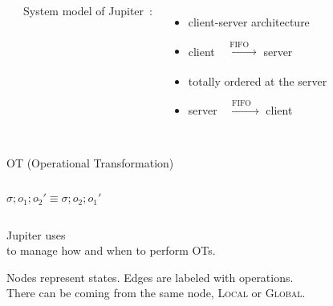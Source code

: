
\begin{frame}{}
  \centerline{\Huge {}}
\end{frame}

\begin{frame}{}
  \begin{columns}
      \begin{center}
	
      \end{center}
      System model of Jupiter~: \\[5pt]
      \begin{itemize}
	\setlength{\itemsep}{10pt}
	\item<1-> client-server architecture
	\item<2-> client $\xrightarrow[]{\quad \text{FIFO} \quad}$ server
	\item<3-> totally ordered at the server
	\item<4-> server $\xrightarrow[]{\quad \text{FIFO} \quad}$ client
      \end{itemize}
  \end{columns}
\end{frame}

\begin{frame}{}
  \centerline{OT (Operational Transformation)~}

  \begin{columns}[c]
      \[
	\sigma; o_1; o_2' \equiv \sigma; o_2; o_1'
      \]
  \end{columns}
\end{frame}

\begin{frame}{}
  \begin{center}
    {\large Jupiter uses ~ \\
    to manage how and when to perform OTs.}
  \end{center}


  \begin{center} 
    \pause
    Nodes represent states. \quad Edges are labeled with operations. \\[6pt]
    \pause
    There can be  coming from the same node, \small{\textsc{Local}} or {\small \textsc{Global}}.
  \end{center}
\end{frame}

